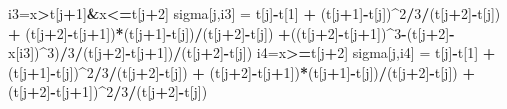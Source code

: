 \documentclass[11pt,]{article}
\newenvironment{Shaded}{\begin{snugshade}}{\end{snugshade}}
\newcommand{\DecValTok}[1]{\textcolor[rgb]{0.00,0.00,0.81}{#1}}
\newcommand{\StringTok}[1]{\textcolor[rgb]{0.31,0.60,0.02}{#1}}
\newcommand{\OperatorTok}[1]{\textcolor[rgb]{0.81,0.36,0.00}{\textbf{#1}}}
\newcommand{\NormalTok}[1]{#1}
\begin{document}
\begin{Shaded}
\begin{Highlighting}[]
\NormalTok{    i3=x}\OperatorTok{>}\NormalTok{t[j}\OperatorTok{+}\DecValTok{1}\NormalTok{]}\OperatorTok{&}\NormalTok{x}\OperatorTok{<=}\NormalTok{t[j}\OperatorTok{+}\DecValTok{2}\NormalTok{]}
\NormalTok{    sigma[j,i3] =}\StringTok{ }\NormalTok{t[j]}\OperatorTok{-}\NormalTok{t[}\DecValTok{1}\NormalTok{] }\OperatorTok{+}\StringTok{ }\NormalTok{(t[j}\OperatorTok{+}\DecValTok{1}\NormalTok{]}\OperatorTok{-}\NormalTok{t[j])}\OperatorTok{^}\DecValTok{2}\OperatorTok{/}\DecValTok{3}\OperatorTok{/}\NormalTok{(t[j}\OperatorTok{+}\DecValTok{2}\NormalTok{]}\OperatorTok{-}\NormalTok{t[j]) }\OperatorTok{+}\StringTok{ }\NormalTok{(t[j}\OperatorTok{+}\DecValTok{2}\NormalTok{]}\OperatorTok{-}\NormalTok{t[j}\OperatorTok{+}\DecValTok{1}\NormalTok{])}\OperatorTok{*}\NormalTok{(t[j}\OperatorTok{+}\DecValTok{1}\NormalTok{]}\OperatorTok{-}\NormalTok{t[j])}\OperatorTok{/}\NormalTok{(t[j}\OperatorTok{+}\DecValTok{2}\NormalTok{]}\OperatorTok{-}\NormalTok{t[j]) }\OperatorTok{+}\NormalTok{((t[j}\OperatorTok{+}\DecValTok{2}\NormalTok{]}\OperatorTok{-}\NormalTok{t[j}\OperatorTok{+}\DecValTok{1}\NormalTok{])}\OperatorTok{^}\DecValTok{3}\OperatorTok{-}\NormalTok{(t[j}\OperatorTok{+}\DecValTok{2}\NormalTok{]}\OperatorTok{-}\NormalTok{x[i3])}\OperatorTok{^}\DecValTok{3}\NormalTok{)}\OperatorTok{/}\DecValTok{3}\OperatorTok{/}\NormalTok{(t[j}\OperatorTok{+}\DecValTok{2}\NormalTok{]}\OperatorTok{-}\NormalTok{t[j}\OperatorTok{+}\DecValTok{1}\NormalTok{])}\OperatorTok{/}\NormalTok{(t[j}\OperatorTok{+}\DecValTok{2}\NormalTok{]}\OperatorTok{-}\NormalTok{t[j])}
\NormalTok{    i4=x}\OperatorTok{>=}\NormalTok{t[j}\OperatorTok{+}\DecValTok{2}\NormalTok{]}
\NormalTok{    sigma[j,i4] =}\StringTok{ }\NormalTok{t[j]}\OperatorTok{-}\NormalTok{t[}\DecValTok{1}\NormalTok{] }\OperatorTok{+}\StringTok{ }\NormalTok{(t[j}\OperatorTok{+}\DecValTok{1}\NormalTok{]}\OperatorTok{-}\NormalTok{t[j])}\OperatorTok{^}\DecValTok{2}\OperatorTok{/}\DecValTok{3}\OperatorTok{/}\NormalTok{(t[j}\OperatorTok{+}\DecValTok{2}\NormalTok{]}\OperatorTok{-}\NormalTok{t[j]) }\OperatorTok{+}\StringTok{ }\NormalTok{(t[j}\OperatorTok{+}\DecValTok{2}\NormalTok{]}\OperatorTok{-}\NormalTok{t[j}\OperatorTok{+}\DecValTok{1}\NormalTok{])}\OperatorTok{*}\NormalTok{(t[j}\OperatorTok{+}\DecValTok{1}\NormalTok{]}\OperatorTok{-}\NormalTok{t[j])}\OperatorTok{/}\NormalTok{(t[j}\OperatorTok{+}\DecValTok{2}\NormalTok{]}\OperatorTok{-}\NormalTok{t[j]) }\OperatorTok{+}\NormalTok{(t[j}\OperatorTok{+}\DecValTok{2}\NormalTok{]}\OperatorTok{-}\NormalTok{t[j}\OperatorTok{+}\DecValTok{1}\NormalTok{])}\OperatorTok{^}\DecValTok{2}\OperatorTok{/}\DecValTok{3}\OperatorTok{/}\NormalTok{(t[j}\OperatorTok{+}\DecValTok{2}\NormalTok{]}\OperatorTok{-}\NormalTok{t[j])}

\end{Highlighting}
\end{Shaded}
\end{document}
